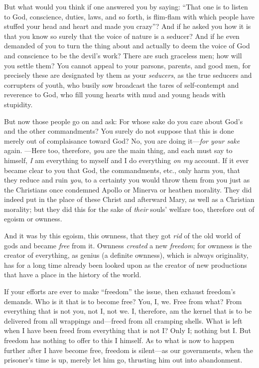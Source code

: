 But what would you think if one answered you by saying: ``That one is to 
listen to God, conscience, duties, laws, and so forth, is flim-flam with which 
people have stuffed your head and heart and made you crazy''? And if he asked 
you how it is that you know so surely that the voice of nature is a seducer? 
And if he even demanded of you to turn the thing about and actually to deem 
the voice of God and conscience to be the devil's work? There are such 
graceless men; how will you settle them? You cannot appeal to your parsons, 
parents, and good men, for precisely these are designated by them as your 
\textit{seducers}, as the true seducers and corrupters of youth, who busily 
sow broadcast the tares of self-contempt and reverence to God, who fill young 
hearts with mud and young heads with stupidity.

But now those people go on and ask: For whose sake do you care about God's and 
the other commandments? You surely do not suppose that this is done merely out 
of complaisance toward God? No, you are doing it---\textit{for your sake} 
again. ---Here too, therefore, \textit{you} are the main thing, and each must 
say to himself, \textit{I} am everything to myself and I do everything 
\textit{on my} account. If it ever became clear to you that God, the 
commandments, etc., only harm you, that they reduce and ruin \textit{you}, to 
a certainty you would throw them from you just as the Christians once 
condemned Apollo or Minerva or heathen morality. They did indeed put in the 
place of these Christ and afterward Mary, as well as a Christian morality; but 
they did this for the sake of \textit{their} souls' welfare too, therefore out 
of egoism or ownness.

And it was by this egoism, this ownness, that they got \textit{rid} of the old 
world of gods and became \textit{free} from it. Ownness \textit{created} a new 
\textit{freedom}; for ownness is the creator of everything, as genius (a 
definite ownness), which is always originality, has for a long time already 
been looked upon as the creator of new productions that have a place in the 
history of the world.

If your efforts are ever to make ``freedom'' the issue, then exhaust 
freedom's demands. Who is it that is to become free? You, I, we. Free from 
what? From everything that is not you, not I, not we. I, therefore, am the 
kernel that is to be delivered from all wrappings and---freed from all 
cramping shells. What is left when I have been freed from everything that is 
not I? Only I; nothing but I. But freedom has nothing to offer to this I 
himself. As to what is now to happen further after I have become free, freedom 
is silent---as our governments, when the prisoner's time is up, merely let 
him go, thrusting him out into abandonment.

